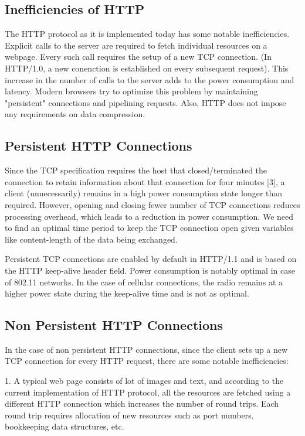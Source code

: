 \documentclass[9pt]{sigplan-proc-varsize}
\begin{document}
\bigskip

\subsection{Inefficiencies of HTTP}

The HTTP protocol as it is implemented today has some notable inefficiencies. Explicit calls to the server are required to fetch individual resources on a webpage. Every such call requires the setup of a new TCP connection. (In HTTP/1.0, a new conenction is established on every subsequent request). This increase in the number of calls to the server adds to the power consumption and latency. Modern browsers try to  optimize this problem by maintaining "persistent" connections and pipelining requests. Also, HTTP does not  impose any requirements on data compression.

\bigskip

\subsection{Persistent HTTP Connections}

Since the TCP specification requires the host that closed/terminated the connection to retain information about that connection for four minutes [3], a client (unnecessarily) remains in a high power consumption state longer than required. However, opening and closing fewer number of TCP connections reduces processing overhead, which leads to a reduction in power consumption. We need to find an optimal time period to keep the TCP connection open given variables like content-length of the data being exchanged. 

Persistent TCP connections are enabled by default in HTTP/1.1 and is based on the HTTP keep-alive header field. Power consumption is notably optimal in case of 802.11 networks. In the case of cellular connections, the radio remains at a higher power state during the keep-alive time and is not as optimal.

\bigskip

\subsection{ Non Persistent HTTP Connections}

In the case of non persistent HTTP connections, since the client sets up a new TCP connection for every HTTP request, there are some notable inefficiencies: 

1. A typical web page consists of lot of images and text, and according to the current implementation of HTTP protocol, all the resources are fetched using a different HTTP connection which increases the number of round trips. Each round trip requires allocation of new resources such as port numbers, bookkeeping data structures, etc.
\end{document}
